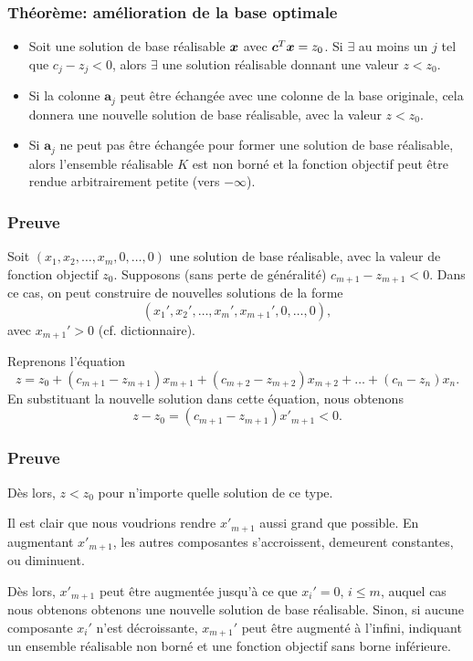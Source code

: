 \documentclass[t,usepdftitle=false]{beamer}
\def\ba{\boldsymbol{a}}
\begin{document}
\begin{frame}
\frametitle{Théorème: amélioration de la base optimale}

\begin{itemize}
\item
Soit une solution de base réalisable ${\boldsymbol{x}}$ avec ${\boldsymbol{c}}^T{\boldsymbol{x}} = z_0$.
Si $\exists$ au moins un $j$ tel que $c_j - z_j < 0$, alors $\exists$ une solution réalisable donnant une valeur $z < z_0$.
\item
Si la colonne $\ba_j$ peut être échangée avec une colonne de la base originale, cela donnera une nouvelle solution de base réalisable, avec la valeur $z < z_0$.
\item
Si $\ba_j$ ne peut pas être échangée pour former une solution de base réalisable, alors l'ensemble réalisable $K$ est non borné et la fonction objectif peut être rendue arbitrairement petite (vers $-\infty$).
\end{itemize}

\end{frame}

\begin{frame}
\frametitle{Preuve}

Soit $(x_1, x_2,\ldots, x_m, 0,\ldots,0)$ une solution de base réalisable, avec la valeur de fonction objectif $z_0$. Supposons (sans perte de généralité) $c_{m+1} - z_{m+1} < 0$. Dans ce cas, on peut construire de nouvelles solutions de la forme
\[
(x_1', x_2', \ldots, x_m', x_{m+1}', 0, \ldots, 0),
\]
avec $x_{m+1}' > 0$ (cf. dictionnaire).

\mbox{}

Reprenons l'équation
\[
z = z_0 + (c_{m+1} - z_{m+1})x_{m+1}
+ (c_{m+2} - z_{m+2})x_{m+2} + \ldots
+ (c_{n} - z_n) x_{n}.
\]
En substituant la nouvelle solution dans cette équation, nous obtenons
\[
z - z_0 = (c_{m+1} - z_{m+1})x'_{m+1} < 0.
\]

\end{frame}

\begin{frame}
\frametitle{Preuve}

Dès lors, $z < z_0$ pour n'importe quelle solution de ce type.

\mbox{}

Il est clair que nous voudrions rendre $x'_{m+1}$ aussi grand que possible. En augmentant $x'_{m+1}$, les autres composantes s'accroissent, demeurent constantes, ou diminuent.

\mbox{}

Dès lors, $x'_{m+1}$ peut être augmentée jusqu'à ce que $x_i' = 0$, $i \leq m$, auquel cas nous obtenons obtenons une nouvelle solution de base réalisable. Sinon, si aucune composante $x_i'$ n'est décroissante, $x_{m+1}'$ peut être augmenté à l'infini, indiquant un ensemble réalisable non borné et une fonction objectif sans borne inférieure.
\end{frame}
\end{document}
